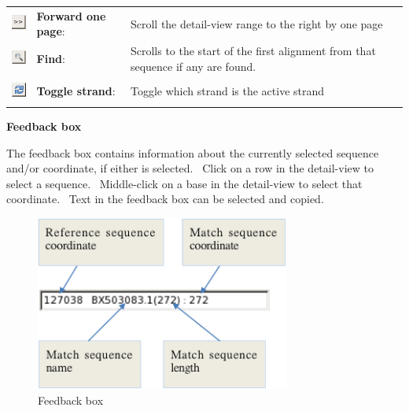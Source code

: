 \documentclass[letterpaper]{article}
\begin{document}
\begin{center}
\begin{supertabular}{b{1.5cm}p{4.373cm}p{8.967cm}}
\includegraphics[width=0.693cm,height=0.693cm]{img_button_forward_page.png} &
\textbf{Forward one}\textbf{\textit{
}}\textbf{page}: &
Scroll the detail-view range to the right by
one page\\
 
\includegraphics[width=0.693cm,height=0.693cm]{img_button_find.png} &
\textbf{Find}: &
Scrolls to the start of the first alignment
from that sequence if any are found.\\
 
\includegraphics[width=0.693cm,height=0.751cm]{img_button_toggle_strand.png} &
\textbf{Toggle strand}: &
Toggle which strand is the active strand\\
\end{supertabular}
\end{center}


\bigskip

{\bfseries Feedback box }

{The feedback box contains information about the currently selected
sequence and/or coordinate, if either is selected. \ Click on a row in
the detail-view to select a sequence. \ Middle-click on a base in the
detail-view to select that coordinate. \ Text in the feedback box can
be selected and copied.}

\begin{figure}
\centering
\color[rgb]{0.30980393,0.5058824,0.7411765}
\includegraphics[width=8.359cm,height=5.75cm]{img_view_feedback_box.png}
\caption{Feedback box}
\end{figure}
\end{document}
